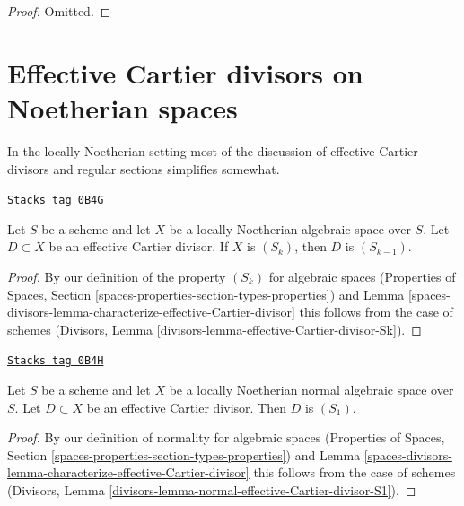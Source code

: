 \begin{proof}
Omitted.
\end{proof}

\section{Effective Cartier divisors on Noetherian spaces}
\label{spaces-divisors-section-Noetherian-effective-Cartier}
In the locally Noetherian setting most of the discussion of
effective Cartier divisors and regular sections simplifies somewhat.

\begin{lemma}
\label{spaces-divisors-lemma-effective-Cartier-divisor-Sk}
\href{https://stacks.math.columbia.edu/tag/0B4G}{\texttt{Stacks tag 0B4G}}

Let $S$ be a scheme and let $X$ be a locally Noetherian algebraic space
over $S$. Let $D \subset X$ be an effective Cartier divisor. If $X$ is
$(S_k)$, then $D$ is $(S_{k - 1})$.
\end{lemma}

\begin{proof}
By our definition of the property $(S_k)$ for algebraic spaces
(Properties of Spaces, Section
\ref{spaces-properties-section-types-properties})
and
Lemma \ref{spaces-divisors-lemma-characterize-effective-Cartier-divisor}
this follows from the case of schemes
(Divisors, Lemma \ref{divisors-lemma-effective-Cartier-divisor-Sk}).
\end{proof}

\begin{lemma}
\label{spaces-divisors-lemma-normal-effective-Cartier-divisor-S1}
\href{https://stacks.math.columbia.edu/tag/0B4H}{\texttt{Stacks tag 0B4H}}

Let $S$ be a scheme and let $X$ be a locally Noetherian normal
algebraic space over $S$. Let $D \subset X$ be an
effective Cartier divisor. Then $D$ is $(S_1)$.
\end{lemma}

\begin{proof}
By our definition of normality for algebraic spaces
(Properties of Spaces, Section
\ref{spaces-properties-section-types-properties})
and
Lemma \ref{spaces-divisors-lemma-characterize-effective-Cartier-divisor}
this follows from the case of schemes
(Divisors, Lemma \ref{divisors-lemma-normal-effective-Cartier-divisor-S1}).
\end{proof}

